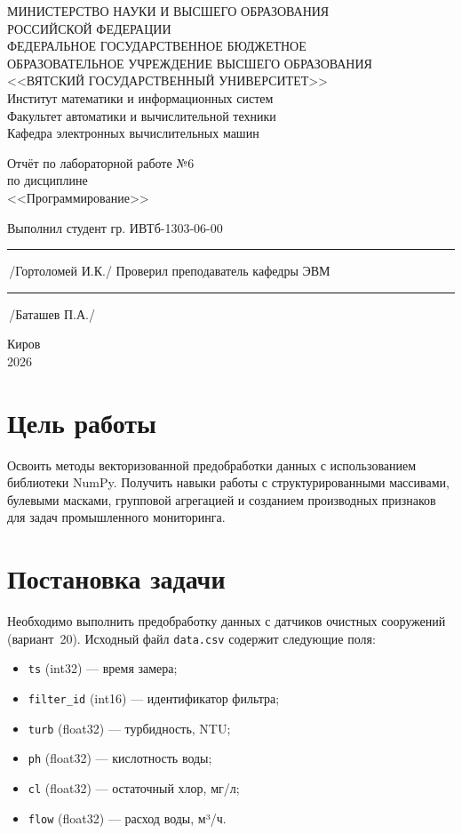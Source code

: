 \documentclass[oneside,a4paper,14pt]{extarticle}
\begin{document}
	\newpage\thispagestyle{empty}
	\begin{center}
		МИНИСТЕРСТВО НАУКИ И ВЫСШЕГО ОБРАЗОВАНИЯ\\
			РОССИЙСКОЙ ФЕДЕРАЦИИ \\
			ФЕДЕРАЛЬНОЕ ГОСУДАРСТВЕННОЕ БЮДЖЕТНОЕ\\
			ОБРАЗОВАТЕЛЬНОЕ
			УЧРЕЖДЕНИЕ ВЫСШЕГО ОБРАЗОВАНИЯ\\
			<<ВЯТСКИЙ ГОСУДАРСТВЕННЫЙ УНИВЕРСИТЕТ>>\\
			Институт математики и информационных систем\\
			Факультет автоматики и вычислительной техники\\
			Кафедра электронных вычислительных машин
	\end{center}
	\vspace{20mm}

	\begin{center}
		Отчёт по лабораторной работе №6\\
		по дисциплине\\
		<<Программирование>>\\
	\end{center}
	\vspace{48mm}

	\noindent
	Выполнил студент гр. ИВТб-1303-06-00 \hfill \rule[-0,5mm]{30mm}{0.15mm}\,/Гортоломей И.К./
	\newline
	Проверил преподаватель кафедры ЭВМ \hfill \rule[-0,5mm]{30mm}{0.15mm}\,/Баташев П.А./

	\vfill
	\begin{center}
		Киров\\
		2026
	\end{center}

\newpage
\section*{Цель работы}
Освоить методы векторизованной предобработки данных с использованием библиотеки NumPy. Получить навыки работы с структурированными массивами, булевыми масками, групповой агрегацией и созданием производных признаков для задач промышленного мониторинга.

\section*{Постановка задачи}
\indent
Необходимо выполнить предобработку данных с датчиков очистных сооружений (вариант~20). Исходный файл \texttt{data.csv} содержит следующие поля:
\begin{itemize}
	\item \texttt{ts} (int32) — время замера;
	\item \texttt{filter\_id} (int16) — идентификатор фильтра;
	\item \texttt{turb} (float32) — турбидность, NTU;
	\item \texttt{ph} (float32) — кислотность воды;
	\item \texttt{cl} (float32) — остаточный хлор, мг/л;
	\item \texttt{flow} (float32) — расход воды, м³/ч.
\end{itemize}
\end{document}
